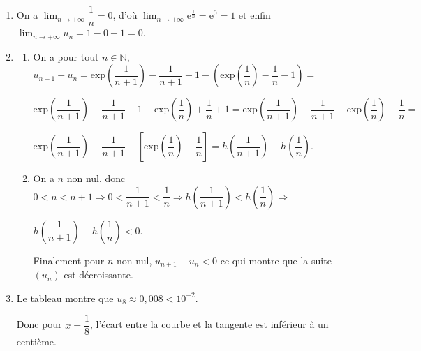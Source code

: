 \documentclass[10pt]{article}
\providecommand{\N}{\mathbb{N}}
\begin{document}
\begin{enumerate}[resume]
\item 
On a $\displaystyle\lim_{n \to + \infty} \dfrac{1}{n} = 0$, d'où $\displaystyle\lim_{n \to + \infty} \text{e}^{\frac1n} = \text{e}^0 = 1$ et enfin $\displaystyle\lim_{n \to + \infty} u_n = 1 - 0 - 1 = 0$.
\item 
	\begin{enumerate}
		\item 
		



On a pour tout $n \in \N$, \: $u_{n+1} - u_n = \text{exp} \left(\dfrac{1}{n+1}\right) - \dfrac{1}{n+1} - 1 - \left(\text{exp} \left(\dfrac{1}{n}\right) - \dfrac{1}{n} - 1 \right) =$

$ \text{exp} \left(\dfrac{1}{n+1}\right) - \dfrac{1}{n+1} - 1 - \text{exp} \left(\dfrac{1}{n}\right) + \dfrac{1}{n} + 1 = \text{exp} \left(\dfrac{1}{n+1}\right) - \dfrac{1}{n+1}  - \text{exp} \left(\dfrac{1}{n}\right) + \dfrac{1}{n}  =$

$\text{exp} \left(\dfrac{1}{n+1}\right) - \dfrac{1}{n+1}  - \left[\text{exp} \left(\dfrac{1}{n}\right) - \dfrac{1}{n}\right] =  h\left(\dfrac{1}{n + 1}\right) - h\left(\dfrac{1}{n}\right)$.
		\item 
		
On a $n$ non nul, donc $0 < n < n + 1 \Rightarrow 0< \dfrac{1}{n+1} < \dfrac{1}{n} \Rightarrow h\left(\dfrac{1}{n+1}\right) < h\left(\dfrac{1}{n}\right) \Rightarrow$
		
		$ h\left(\dfrac{1}{n + 1}\right) - h\left(\dfrac{1}{n}\right) < 0$.
		
		Finalement pour $n$ non nul, $u_{n+1} - u_n < 0$ ce qui montre que la suite $\left(u_n\right)$ est décroissante.
	\end{enumerate}
\item 


















Le tableau montre que $u_8 \approx 0,008 < 10^{-2}$.

Donc pour $x = \dfrac{1}{8}$, l'écart entre la courbe et la tangente est inférieur à un centième.

\end{enumerate}

\bigskip
\end{document}
